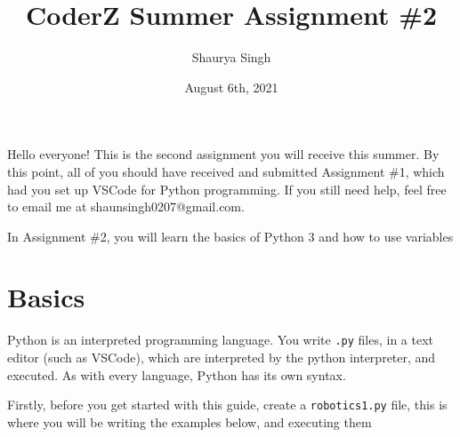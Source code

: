 \documentclass{scrartcl}
\author{Shaurya Singh}
\date{August 6th, 2021}
\title{CoderZ Summer Assignment \#2}
\begin{document}
\maketitle
\setcounter{tocdepth}{2}
\tableofcontents

Hello everyone! This is the second assignment you will receive this summer. By this
point, all of you should have received and submitted Assignment \#1, which had
you set up VSCode for Python programming. If you still need help, feel free to
email me at shaunsingh0207@gmail.com.

In Assignment \#2, you will learn the basics of Python 3 and how to use variables

\section{Basics}
\label{sec:orgd1812b9}
Python is an interpreted programming language. You write \texttt{.py} files, in a text
editor (such as VSCode), which are interpreted by the python interpreter, and
executed. As with every language, Python has its own syntax.

Firstly, before you get started with this guide, create a \texttt{robotics1.py} file,
this is where you will be writing the examples below, and executing them
\end{document}
